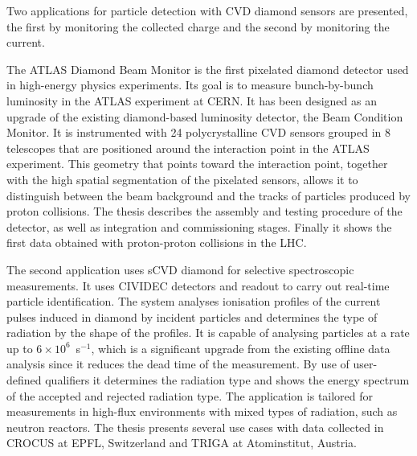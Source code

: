 Two applications for particle detection with CVD diamond sensors are presented, the first by monitoring the collected charge and the second by monitoring the current.

The ATLAS Diamond Beam Monitor is the first pixelated diamond detector used in high-energy physics experiments. Its goal is to measure bunch-by-bunch luminosity in the ATLAS experiment at CERN. It has been designed as an upgrade of the existing diamond-based luminosity detector, the Beam Condition Monitor. It is instrumented with 24 polycrystalline CVD sensors grouped in 8 telescopes that are positioned around the interaction point in the ATLAS experiment. This geometry that points toward the interaction point, together with the high spatial segmentation of the pixelated sensors, allows it to distinguish between the beam background and the tracks of particles produced by proton collisions. The thesis describes the assembly and testing procedure of the detector, as well as integration and commissioning stages. Finally it shows the first data obtained with proton-proton collisions in the LHC.

The second application uses sCVD diamond for selective spectroscopic measurements. It uses CIVIDEC detectors and readout to carry out real-time particle identification. The system analyses ionisation profiles of the current pulses induced in diamond by incident particles and determines the type of radiation by the shape of the profiles. It is capable of analysing particles at a rate up to $6\times10^6$~s$^{-1}$, which is a significant upgrade from the existing offline data analysis since it reduces the dead time of the measurement. By use of user-defined qualifiers it determines the radiation type and shows the energy spectrum of the accepted and rejected radiation type. The application is tailored for measurements in high-flux environments with mixed types of radiation, such as neutron reactors. The thesis presents several use cases with data collected in CROCUS at EPFL, Switzerland and TRIGA at Atominstitut, Austria. 
